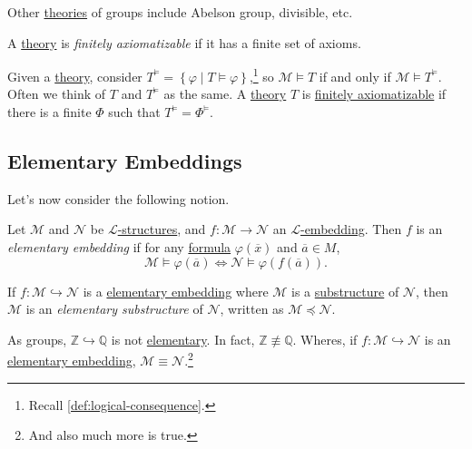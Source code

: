 Other \hyperref[def:theory]{theories} of groups include Abelson group, divisible, etc.

\begin{definition}\label{def:finitely-axiomatizable}
	A \hyperref[def:theory]{theory} is \emph{finitely axiomatizable} if it has a finite set of axioms.
\end{definition}

Given a \hyperref[def:theory]{theory}, consider \(T^{\models } = \left\{ \varphi \mid T \models \varphi \right\}\),\footnote{Recall \autoref{def:logical-consequence}.} so \(\mathcal{M} \models T\) if and only if \(\mathcal{M} \models T^{\models }\). Often we think of \(T\) and \(T^{\models }\) as the same. A \hyperref[def:theory]{theory} \(T\) is \hyperref[def:finitely-axiomatizable]{finitely axiomatizable} if there is a finite \(\Phi \) such that \(T^{\models } = \Phi ^{\models }\).

\subsection{Elementary Embeddings}
Let's now consider the following notion.

\begin{definition}\label{def:elementary-embedding}
	Let \(\mathcal{M} \) and \(\mathcal{N} \) be \hyperref[def:structure]{\(\mathcal{L} \)-structures}, and \(f\colon \mathcal{M} \to \mathcal{N} \) an \hyperref[def:embedding]{\(\mathcal{L} \)-embedding}. Then \(f\) is an \emph{elementary embedding} if for any \hyperref[def:formula]{formula} \(\varphi (\overline{x} )\) and \(\overline{a} \in M\),
	\[
		\mathcal{M} \models \varphi (\overline{a} )\iff \mathcal{N} \models \varphi (f(\overline{a} )).
	\]
\end{definition}

\begin{definition}\label{def:elementary-substructure}
	If \(f\colon \mathcal{M} \hookrightarrow \mathcal{N} \) is a \hyperref[def:elementary-embedding]{elementary embedding} where \(\mathcal{M}\) is a \hyperref[def:substructure]{substructure} of \(\mathcal{N} \), then \(\mathcal{M} \) is an \emph{elementary substructure} of \(\mathcal{N} \), written as \(\mathcal{M} \preceq \mathcal{N} \).
\end{definition}

\begin{eg}
	As groups, \(\mathbb{Z} \hookrightarrow \mathbb{Q} \) is not \hyperref[def:elementary-embedding]{elementary}. In fact, \(\mathbb{Z} \not\equiv \mathbb{Q} \). Wheres, if \(f\colon \mathcal{M} \hookrightarrow \mathcal{N} \) is an \hyperref[def:elementary-embedding]{elementary embedding}, \(\mathcal{M} \equiv \mathcal{N} \).\footnote{And also much more is true.}
\end{eg}

